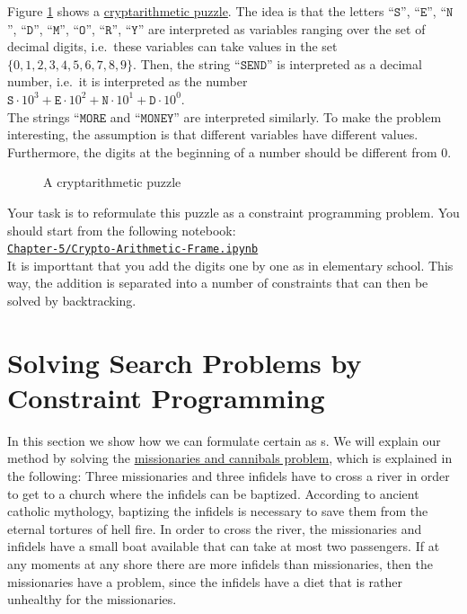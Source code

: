 \exerciseEng
Figure \ref{fig:send-more-money.pdf} shows a
\href{https://en.wikipedia.org/wiki/Verbal_arithmetic}{cryptarithmetic puzzle}.
The idea is that the letters 
``$\texttt{S}$'', ``$\texttt{E}$'', ``$\texttt{N}$'', ``$\texttt{D}$'', ``$\texttt{M}$'', ``$\texttt{O}$'', ``$\texttt{R}$'', ``$\texttt{Y}$'' 
are interpreted as variables ranging over the set of decimal digits, i.e.~these variables can take values in
the set $\{0,1,2,3,4,5,6,7,8,9\}$.  Then, the string ``$\texttt{SEND}$'' is interpreted as a decimal number,
i.e.~it is interpreted as the number
\\[0.2cm]
\hspace*{1.3cm}
$\texttt{S} \cdot 10^3 + \texttt{E} \cdot 10^2 + \texttt{N} \cdot 10^1 + \texttt{D} \cdot 10^0$.
\\[0.2cm]
The strings ``$\texttt{MORE}$ and ``$\texttt{MONEY}$'' are interpreted similarly. To make the problem
interesting, the assumption is that different variables have different values.  Furthermore, the
digits at the beginning of a number should be different from $0$.


\begin{figure}[!ht]
\centering
{}

\caption{A cryptarithmetic puzzle}
\label{fig:send-more-money.pdf}
\end{figure}

Your task is to reformulate this puzzle as a constraint
programming problem.  You should start from the following notebook:
\\[0.2cm]
\hspace*{1.3cm}
\href{https://github.com/karlstroetmann/Logic/blob/master/TypeScript/Chapter-5/Crypto-Arithmetic-Frame.ipynb}{\texttt{Chapter-5/Crypto-Arithmetic-Frame.ipynb}}
\\[0.2cm]
It is importtant that you add the digits one by one as in elementary school.  This way, the addition is
separated into a number of constraints that can then be solved by backtracking.  \eox

\section{Solving Search Problems by Constraint Programming}
In this section we show how we can formulate certain  as s.
We will explain our method by solving the
\href{https://flashmuseum.org/priests-n-devils/}{missionaries and cannibals problem},
which is explained in the following:
Three missionaries and three infidels have to cross a river in order to get to a church where the infidels can
be baptized.  According to ancient catholic mythology, baptizing the infidels is necessary to save them from
the eternal tortures of hell fire. In order to cross the river, the missionaries and infidels have a small boat
available that can take at most two passengers. If at any moments at any shore there are more infidels than
missionaries, then the missionaries have a problem, since the infidels have a diet that is rather unhealthy for
the missionaries. 

